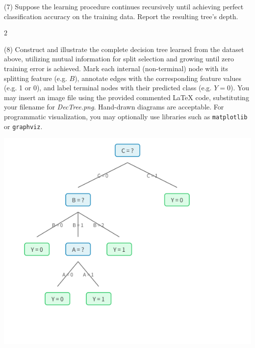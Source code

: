 \documentclass[11pt,addpoints,answers]{exam}
\begin{document}
\begin{questions}
		
		\item[(7)] Suppose the learning procedure continues recursively until achieving perfect classification accuracy on the training data. Report the resulting tree's depth.
		
		\begin{minipage}[t]{0.25\textwidth}
			\begin{answer_box}[title=Depth]
				$2$
			\end{answer_box}
		\end{minipage}
		
		
		\item[(8)] Construct and illustrate the complete decision tree learned from the dataset above, utilizing mutual information for split selection and growing until zero training error is achieved. Mark each internal (non-terminal) node with its splitting feature (e.g. $B$), annotate edges with the corresponding feature values (e.g. 1 or 0), and label terminal nodes with their predicted class (e.g. $Y=0$). You may insert an image file using the provided commented \LaTeX{} code, substituting your filename for \textit{DecTree.png}. Hand-drawn diagrams are acceptable. For programmatic visualization, you may optionally use libraries such as \texttt{matplotlib} or \texttt{graphviz}.
		
		\begin{answer_box}[title=Decision Tree, height=9cm]
			\begin{center}
			\includegraphics[width=0.8\linewidth]{DecTree.png}
			\end{center}
		\end{answer_box}
		

\end{questions}
\end{document}
